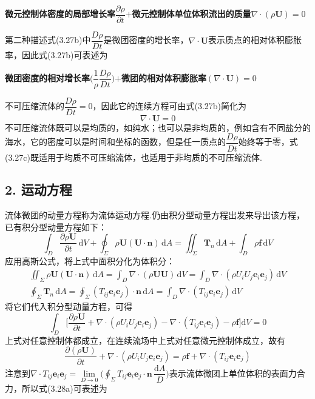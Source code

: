 \textbf{微元控制体密度的局部增长率}$\dfrac{\partial\rho}{\partial t}$\textbf{$+$微元控制体单位体积流出的质量}$\nabla\cdot(\rho\boldsymbol{U})=0$

第二种描述式(3.27b)中$\dfrac{D\rho}{Dt}$是微团密度的增长率，$\nabla\cdot\boldsymbol{U}$表示质点的相对体积膨胀率，因此式(3.27b)可表述为

\textbf{微团密度的相对增长率}$\Big(\dfrac{1}{\rho}\dfrac{D\rho}{Dt}\Big)$\textbf{$+$微团的相对体积膨胀率}$(\nabla\cdot\boldsymbol{U})=0$

不可压缩流体的$\dfrac{D\rho}{Dt}=0$，因此它的连续方程可由式(3.27b)简化为
\begin{equation*}
\nabla\cdot\boldsymbol{U}=0
\tag{3.27c}
\end{equation*}
不可压缩流体既可以是均质的，如纯水；也可以是非均质的，例如含有不同盐分的海水，它的密度可以是时间和坐标的函数，但是任一质点的$\dfrac{D\rho}{Dt}$始终等于零，式(3.27c)既适用于均质不可压缩流体，也适用于非均质的不可压缩流体.

\subsection*{2. 运动方程}

流体微团的动量方程称为流体运动方程.仍由积分型动量方程出发来导出该方程，已有积分型动量方程如下：
\[
\int_D \frac{\partial\rho\boldsymbol{U}}{\partial t}\,\mathrm{d}V+\oint_\Sigma \rho\boldsymbol{U}(\boldsymbol{U}\cdot\boldsymbol{n})\,\mathrm{d}A=\iint_\Sigma \boldsymbol{T}_n\,\mathrm{d}A+\int_D \rho\boldsymbol{f}\,\mathrm{d}V
\]
应用高斯公式，将上式中面积分化为体积分：
\begin{gather*}
\iint_\Sigma \rho\boldsymbol{U}(\boldsymbol{U}\cdot\boldsymbol{n})\,\mathrm{d}A=\int_D \nabla\cdot(\rho\boldsymbol{U}\boldsymbol{U})\,\mathrm{d}V=\int_D \nabla\cdot(\rho U_iU_j\boldsymbol{e}_i\boldsymbol{e}_j)\,\mathrm{d}V\\[2pt]
\oint_\Sigma \boldsymbol{T}_n\,\mathrm{d}A=\oint_\Sigma (T_{ij}\boldsymbol{e}_i\boldsymbol{e}_j)\cdot\boldsymbol{n}\,\mathrm{d}A=\int_D \nabla\cdot(T_{ij}\boldsymbol{e}_i\boldsymbol{e}_j)\,\mathrm{d}V
\end{gather*}
将它们代入积分型动量方程，可得
\[
\int_D \bigg[\frac{\partial\rho\boldsymbol{U}}{\partial t}+\nabla\cdot(\rho U_iU_j\boldsymbol{e}_i\boldsymbol{e}_j)-\nabla\cdot(T_{ij}\boldsymbol{e}_i\boldsymbol{e}_j)-\rho\boldsymbol{f}\bigg]\mathrm{d}V=0
\]
上式对任意控制体都成立，在连续流场中上式对任意微元控制体成立，故有
\begin{equation*}
\frac{\partial(\rho\boldsymbol{U})}{\partial t}+\nabla\cdot(\rho U_iU_j\boldsymbol{e}_i\boldsymbol{e}_j)=\rho\boldsymbol{f}+\nabla\cdot(T_{ij}\boldsymbol{e}_i\boldsymbol{e}_j)
\tag{3.28a}
\end{equation*}
注意到$\nabla\cdot T_{ij}\boldsymbol{e}_i\boldsymbol{e}_j=\lim\limits_{D\to 0}\Big(\displaystyle\oint_\Sigma T_{ij}\boldsymbol{e}_i\boldsymbol{e}_j\cdot\boldsymbol{n}\,\dfrac{\mathrm{d}A}{D}\Big)$表示流体微团上单位体积的表面力合力，所以式(3.28a)可表述为

